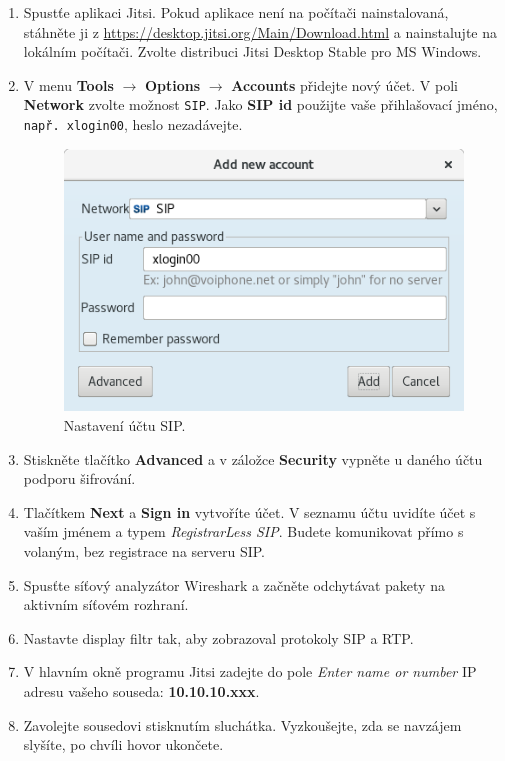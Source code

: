 \begin{enumerate}
    \item Spustťe aplikaci Jitsi. Pokud aplikace není na počítači nainstalovaná, stáhněte ji z \url{https://desktop.jitsi.org/Main/Download.html} a nainstalujte na lokálním počítači. Zvolte distribuci Jitsi Desktop Stable pro MS Windows. 
    \item V menu {\bf Tools} $\rightarrow$ {\bf Options} $\rightarrow$ {\bf Accounts} přidejte nový účet. V poli {\bf Network} zvolte možnost {\tt SIP}. Jako {\bf SIP id} použijte vaše přihlašovací jméno, {\tt např. xlogin00}, heslo nezadávejte.
    \begin{figure}[h]
    	\centering
    	\includegraphics[scale=0.5]{img/account_p2p.png}
    	\caption{Nastavení účtu SIP.}
    	\label{fig:sip_account}
    \end{figure}

    \item Stiskněte tlačítko {\bf Advanced} a v záložce {\bf Security} vypněte u daného účtu podporu šifrování.
    \item Tlačítkem {\bf Next} a {\bf Sign in} vytvoříte účet. V seznamu účtu uvidíte účet s vaším jménem a typem {\it RegistrarLess SIP}. Budete komunikovat přímo s volaným, bez registrace na serveru SIP.
    \item Spusťte síťový analyzátor Wireshark a začněte odchytávat pakety na aktivním síťovém rozhraní.
    \item Nastavte display filtr tak, aby zobrazoval protokoly SIP a RTP.
    \item V hlavním okně programu Jitsi zadejte do pole {\it Enter name or number} IP adresu vašeho souseda: {\bf 10.10.10.xxx}.
    \item Zavolejte sousedovi stisknutím sluchátka. Vyzkoušejte, zda se navzájem slyšíte, po chvíli hovor ukončete.
      

\end{enumerate}
